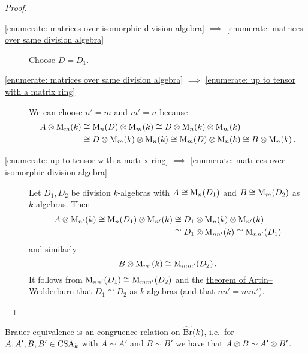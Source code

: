 \begin{proof}
  \leavevmode
  \begin{description}
    \item[\ref*{enumerate: matrices over isomorphic division algebra} $\implies$ \ref*{enumerate: matrices over same division algebra}]
      Choose $D = D_1$.
    \item[\ref*{enumerate: matrices over same division algebra} $\implies$ \ref*{enumerate: up to tensor with a matrix ring}]
      We can choose $n' = m$ and $m' = n$ because
      \begin{align*}
              A \mathbin{\otimes} \operatorname{M}_m(k)
        &\cong \operatorname{M}_n(D) \mathbin{\otimes} \operatorname{M}_m(k)
         \cong D \mathbin{\otimes} \operatorname{M}_n(k) \mathbin{\otimes} \operatorname{M}_m(k)  \\
        &\cong D \mathbin{\otimes} \operatorname{M}_m(k) \mathbin{\otimes} \operatorname{M}_n(k)
         \cong \operatorname{M}_m(D) \mathbin{\otimes} \operatorname{M}_n(k)
         \cong B \mathbin{\otimes} \operatorname{M}_n(k) \,.
      \end{align*}
    \item[\ref*{enumerate: up to tensor with a matrix ring} $\implies$ \ref*{enumerate: matrices over isomorphic division algebra}]
      Let $D_1, D_2$ be division $k$-algebras with $A \cong \operatorname{M}_n(D_1)$ and $B \cong \operatorname{M}_m(D_2)$ as $k$-algebras.
      Then
      \begin{align*}
                A \mathbin{\otimes} \operatorname{M}_{n'}(k)
         \cong  \operatorname{M}_n(D_1) \mathbin{\otimes} \operatorname{M}_{n'}(k)
        &\cong  D_1 \mathbin{\otimes} \operatorname{M}_n(k) \mathbin{\otimes} \operatorname{M}_{n'}(k)  \\
        &\cong  D_1 \mathbin{\otimes} \operatorname{M}_{nn'}(k)
         \cong  \operatorname{M}_{nn'}(D_1)
      \end{align*}
      and similarly
      \[
              B \mathbin{\otimes} \operatorname{M}_{m'}(k)
        \cong \operatorname{M}_{mm'}(D_2) \,.
      \]
      It follows from $\operatorname{M}_{nn'}(D_1) \cong \operatorname{M}_{mm'}(D_2)$ and the \hyperref[theorem: artin wedderburn theorem]{theorem of Artin--Wedderburn} that $D_1 \cong D_2$ as $k$-algebras (and that $nn' = mm'$).
    \qedhere
  \end{description}
\end{proof}


\begin{corollary}
  \label{corollary: Brauer equivalence is a congruence relation}
  Brauer equivalence is an congruence relation on $\widetilde{\operatorname{Br}}(k)$, i.e.\ for $A, A', B, B' \in \operatorname{CSA}_k$ with $A \sim A'$ and $B \sim B'$ we have that $A \mathbin{\otimes} B \sim A' \mathbin{\otimes} B'$.
\end{corollary}


